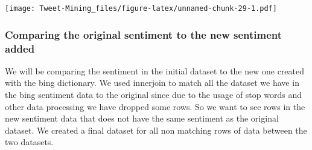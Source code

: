 \documentclass[
]{article}
\newenvironment{Shaded}{\begin{snugshade}}{\end{snugshade}}
\newcommand{\CommentTok}[1]{\textcolor[rgb]{0.56,0.35,0.01}{\textit{#1}}}
\newcommand{\DataTypeTok}[1]{\textcolor[rgb]{0.13,0.29,0.53}{#1}}
\newcommand{\DecValTok}[1]{\textcolor[rgb]{0.00,0.00,0.81}{#1}}
\newcommand{\KeywordTok}[1]{\textcolor[rgb]{0.13,0.29,0.53}{\textbf{#1}}}
\newcommand{\NormalTok}[1]{#1}
\newcommand{\OperatorTok}[1]{\textcolor[rgb]{0.81,0.36,0.00}{\textbf{#1}}}
\newcommand{\OtherTok}[1]{\textcolor[rgb]{0.56,0.35,0.01}{#1}}
\newcommand{\StringTok}[1]{\textcolor[rgb]{0.31,0.60,0.02}{#1}}
\begin{document}
\begin{Shaded}
\end{Shaded}

\texttt{[image: Tweet-Mining\_files/figure-latex/unnamed-chunk-29-1.pdf]}

\hypertarget{comparing-the-original-sentiment-to-the-new-sentiment-added}{%
\subsubsection{Comparing the original sentiment to the new sentiment
added}\label{comparing-the-original-sentiment-to-the-new-sentiment-added}}

We will be comparing the sentiment in the initial dataset to the new one
created with the bing dictionary. We used innerjoin to match all the
dataset we have in the bing sentiment data to the original since due to
the usage of stop words and other data processing we have dropped some
rows. So we want to see rows in the new sentiment data that does not
have the same sentiment as the original dataset. We created a final
dataset for all non matching rows of data between the two datasets.
\end{document}
